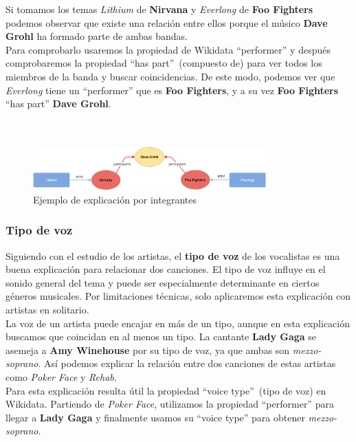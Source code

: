 Si tomamos los temas \textit{Lithium} de \textbf{Nirvana} y \textit{Everlong} de \textbf{Foo Fighters} podemos observar que existe una relación entre ellos porque el músico \textbf{Dave Grohl} ha formado parte de ambas bandas.\\

Para comprobarlo usaremos la propiedad de Wikidata ``performer'' y después comprobaremos la propiedad ``has part''~(compuesto de) para ver todos los miembros de la banda y buscar coincidencias. De este modo, podemos ver que \textit{Everlong} tiene un ``performer'' que es \textbf{Foo Fighters}, y a su vez \textbf{Foo Fighters} ``has part'' \textbf{Dave Grohl}.\\\\\\

\begin{figure}[h!]
	\centering
	\includegraphics[width = 0.8\textwidth]{Imagenes/Bitmap/Integrante ejemplo.png}
	\caption{Ejemplo de explicación por integrantes}
	\label{fig:sampleImage}
\end{figure}

\subsubsection*{Tipo de voz}

Siguiendo con el estudio de los artistas, el \textbf{tipo de voz} de los vocalistas es una buena explicación para relacionar dos canciones. El tipo de voz influye en el sonido general del tema y puede ser especialmente determinante en ciertos géneros musicales. Por limitaciones técnicas, solo aplicaremos esta explicación con artistas en solitario.\\

La voz de un artista puede encajar en más de un tipo, aunque en esta explicación buscamos que coincidan en al menos un tipo. La cantante \textbf{Lady Gaga} se asemeja a \textbf{Amy Winehouse} por su tipo de voz, ya que ambas son \textit{mezzo-soprano}. Así podemos explicar la relación entre dos canciones de estas artistas como \textit{Poker Face} y \textit{Rehab}.\\

Para esta explicación resulta útil la propiedad ``voice type''~(tipo de voz) en Wikidata. Partiendo de \textit{Poker Face}, utilizamos la propiedad ``performer'' para llegar a \textbf{Lady Gaga} y finalmente usamos su ``voice type'' para obtener \textit{mezzo-soprano}.\\

